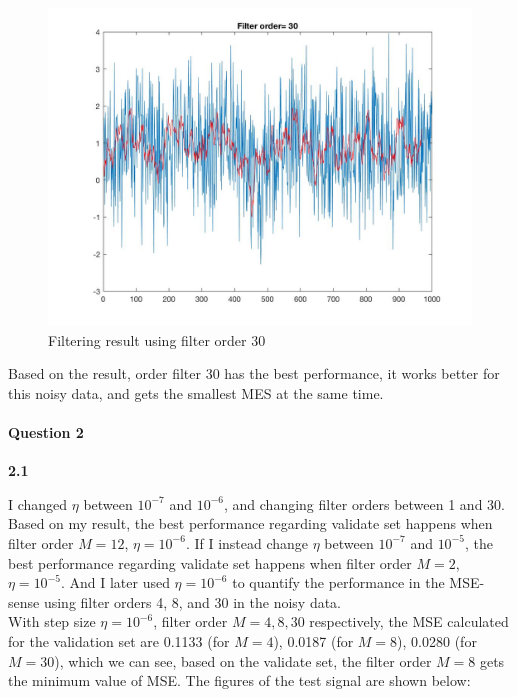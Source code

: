 \documentclass[a4paper]{article}
\begin{document}
\begin{spacing}{2.0}
	\begin{figure}[H]
	    \centering
	        \includegraphics[width=4.5in]{1_2_4.jpg}
	        \caption{Filtering result using filter order 30}
	        \label{fig:side:a}
	\end{figure}
	Based on the result, order filter 30 has the best performance, it works better for this noisy data, and gets the smallest MES at the same time.
\paragraph{\huge\textbf{ Question 2\\} }

\normalsize
\noindent

\textbf{2.1} 

I changed $\eta$ between $10^{-7}$ and $10^{-6}$, and changing filter orders between 1 and 30. Based on my result, the best performance regarding validate set happens when filter order $M = 12$, $\eta = 10^{-6}$. If I instead change $\eta$ between $10^{-7}$ and $10^{-5}$, the best performance regarding validate set happens when filter order $M = 2$, $\eta = 10^{-5}$. And I later used $\eta = 10^{-6}$ to quantify the performance in the MSE-sense using filter orders 4, 8, and 30 in the noisy data. \\
With step size $\eta = 10^{-6}$, filter order $M = 4, 8, 30$ respectively, the MSE calculated for the validation set are 0.1133 (for $M = 4$), 0.0187 (for $M = 8$), 0.0280 (for $M = 30$), which we can see, based on the validate set, the filter order $M =8$ gets the minimum value of MSE. The figures of the test signal are shown below:


\end{spacing}
\end{document}
